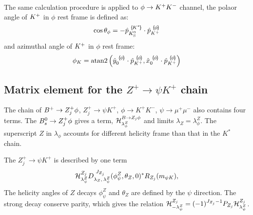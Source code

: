 The same calculation procedure is applied to $\phi\rightarrow{\ensuremath{{K}^+}}{\ensuremath{{K}^-}}$ channel,
the polaor angle of ${{K}^+}$ in $\phi$ rest frame is defined as:
\begin{equation}
\cos \theta_{\phi} = -{\hat{p}}_{{{{K}^0_{\mathrm{S}}}}}^{\,\,\{\!{{K}^*}\!\}} \cdot {\hat{p}}_{{{{K}^+}}}^{\,\,\{\!\phi\!\}}
\end{equation}
and azimuthal angle of ${{K}^+}$ in $\phi$ rest frame:
\begin{equation}
\phi_{K} = \mathrm{atan2}  \left(  \BA{\hat{y}}{0}{\phi} \cdot \BA{\hat{p}}{\Kp}{\phi}, \BA{\hat{x}}{0}{\phi} \cdot \BA{\hat{p}}{\Kp}{\phi} \right)
\end{equation}




\subsection{Matrix element for the $Z^+ \to \psi K^+$ chain}
The chain of ${{{B}^+}}\rightarrow {\ensuremath{Z}}^+_j \phi$, $Z^+_j\to \psi K^+$, $\phi\to K^+K^-$,  $\psi\to \mu^+\mu^-$ also contains four terms. 
The ${{B}^0_{s}}\rightarrow {\ensuremath{Z}}^+_j \phi$ gives a term, ${\cal H}^{B\rightarrow Z_j \phi}_{\lambda_{\phi}^Z}$ and limits $\lambda_{Z}=\lambda_{\phi}^Z$. 
The superscript $Z$ in $\lambda_{\phi}$ accounts for different helicity frame than that in the $K^*$ chain. 

The $Z^+_j \to \psi K^+$ is described by one term 
\begin{equation}
{\cal H}_{\lambda_\psi^{Z}}^{Z_{j}}D^{\,\,J_{Z_j}}_{\lambda_Z,\,\lambda_\psi^{Z}}(\phi_\psi^Z,\theta_{Z},0)^*R_{Z_j}(m_{\psi K}),
\end{equation}
The helicity angles of $Z$ decays $\phi_\psi^Z$ and $\theta_{Z}$ are defined by the $\psi$ direction. 
The strong decay conserve parity, which gives the relation ${\cal H}_{-\lambda_\psi^{Z}}^{Z_{j}}=(-1)^{J_{Z_j}-1}P_{Z_j}{\cal H}_{\lambda_\psi^{Z}}^{Z_{j}}$.


